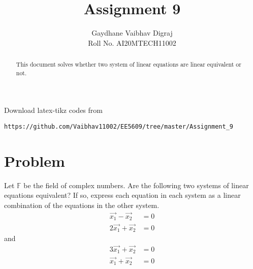 \documentclass[journal,12pt,twocolumn]{IEEEtran}
\begin{document}
     \def\rightbox#1{\makebox[0in][r]{#1}}
     \def\centbox#1{\makebox[0in]{#1}}
     \def\topbox#1{\raisebox{-\baselineskip}[0in][0in]{#1}}
     \def\midbox#1{\raisebox{-0.5\baselineskip}[0in][0in]{#1}}
\vspace{3cm}
\title{Assignment 9}
\author{Gaydhane Vaibhav Digraj \\ Roll No. AI20MTECH11002}
\maketitle
\newpage
\bigskip
\renewcommand{\thefigure}{\theenumi}
\renewcommand{\thetable}{\theenumi}
\begin{abstract}
This document solves whether two system of linear equations are linear equivalent or not.  
\end{abstract}
%
Download latex-tikz codes from 
%
\begin{lstlisting}
https://github.com/Vaibhav11002/EE5609/tree/master/Assignment_9
\end{lstlisting}
%
\section{Problem}
Let $\mathbb{F}$ be the field of complex numbers. Are the following two systems of linear equations equivalent? If so, express each equation in each system as a linear combination of the equations in the other system.
\begin{align*}
    \vec{x_1}-\vec{x_2}&=0\\
    2\vec{x_1}+\vec{x_2}&=0
\end{align*}
and 
\begin{align*}
    3\vec{x_1}+\vec{x_2}&=0 \\
    \vec{x_1}+\vec{x_2}&=0
\end{align*}
\end{document}
